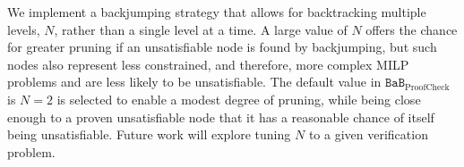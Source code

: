 \documentclass[oneside,11pt,dvipsnames]{book}
\numberwithin{equation}{section}
\theoremstyle{definition}
\theoremstyle{remark}
\newcommand{\hd}[1]{\iftoggle{usecomment}{{\color{blue}{[HD]: #1}}}{}}
\newcommand{\proofcheck}{\texttt{BaB$_{\text{ProofCheck}}$}}
\begin{document}
We implement a backjumping strategy that allows for backtracking multiple levels, $N$, rather than a single level at a time.
A large value of $N$ offers the chance for greater pruning if an unsatisfiable node is found by
backjumping, but such nodes also represent less constrained, and therefore, more complex MILP problems
and are less likely to be unsatisfiable.
The default value in $\proofcheck{}$ is $N=2$ is selected to enable a modest degree of pruning,
while being close enough to a proven unsatisfiable node that it has a reasonable chance of itself being unsatisfiable.
Future work will explore tuning $N$ to a given verification problem.




\end{document}
